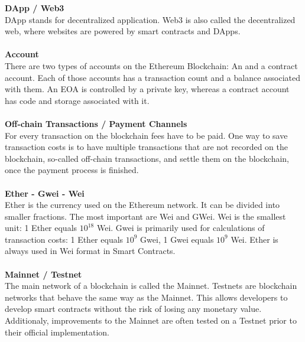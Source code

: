 \textbf{DApp / Web3}\\
DApp stands for decentralized application. Web3 is also called the decentralized web, where websites are powered by smart contracts and DApps. 
\\\\

\textbf{Account}\\
There are two types of accounts on the Ethereum Blockchain: An  and a contract account. Each of those accounts has a transaction count and a balance\cite{ethereum-yellow-paper} associated with them. An EOA is controlled by a private key, whereas a contract account has code and storage associated with it.
\\\\

\textbf{Off-chain Transactions / Payment Channels}\\
For every transaction on the blockchain fees have to be paid. One way to save transaction costs is to have multiple transactions that are not recorded on the blockchain, so-called off-chain transactions, and settle them on the blockchain, once the payment process is finished.
\\\\

\textbf{Ether - Gwei - Wei}\\
Ether is the currency used on the Ethereum network. It can be divided into smaller fractions. The most important are Wei and GWei. Wei is the smallest unit: 1 Ether equals \(10^{18}\) Wei\cite{ethereum-yellow-paper}. Gwei is primarily used for calculations of transaction costs: 1 Ether equals \(10^{9}\) Gwei, 1 Gwei equals \(10^{9}\) Wei. Ether is always used in Wei format in Smart Contracts.
\\\\

\textbf{Mainnet / Testnet}\\
The main network of a blockchain is called the Mainnet. Testnets are blockchain networks that behave the same way as the Mainnet. This allows developers to develop smart contracts without the risk of losing any monetary value. Additionaly, improvements to the Mainnet are often tested on a Testnet prior to their official implementation.